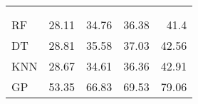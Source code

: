 \begin{margintable}
	\centering
	\begin{tabularx}{1\marginparwidth}{Xd{2.1}d{2.1}d{1.1}d{1.1}}
		\toprule
		&
		&    
		 &
		 &
		 \\
		\\
		\midrule
		RF & 28.11 & 34.76 &36.38 & 41.4 \\ 
		DT & 28.81 & 35.58 &37.03 & 42.56 \\ 
		KNN& 28.67 & 34.61 &36.36 & 42.91 \\ 
		GP & 53.35 & 66.83 &69.53 & 79.06 \\ \midrule
		

\end{tabularx}
\end{margintable}
